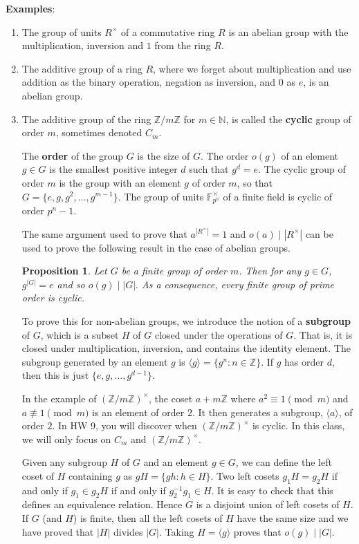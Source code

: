 \documentclass{article}
\def\Z{{\mathbb Z}}
\def\F{{\mathbb F}}
\def\N{{\mathbb N}}
\def\Z{{\mathbb Z}}
\def\F{{\mathbb F}}
\newtheorem{proposition}[subsection]{Proposition}
\begin{document}
\vspace{5pt}
\noindent\textbf{Examples}:
\begin{enumerate}
    \item The group of units $R^\times$ of a commutative ring $R$ is an abelian group with the multiplication, inversion and $1$ from the ring $R$.
    \item The additive group of a ring $R$, where we forget about multiplication and use addition as the binary operation, negation as inversion, and $0$ as $e$, is an abelian group.
    \item The additive group of the ring $\Z/m\Z$ for $m\in\N$, is called the \textbf{cyclic} group of order $m$, sometimes denoted $C_m$.

    The \textbf{order} of the group $G$ is the size of $G$. The order $o(g)$ of an element $g\in G$ is the smallest positive integer $d$ such that $g^d = e$. The cyclic group of order $m$ is the group with an element $g$ of order $m$, so that $G = \{e, g, g^2,\ldots, g^{m-1}\}$. The group of units $\F_{p^n}^\times$ of a finite field is cyclic of order $p^n - 1$.

    The same argument used to prove that $a^{|R^\times|} = 1$ and $o(a)\mid|R^\times|$ can be used to prove the following result in the case of abelian groups.

    \begin{proposition}
        Let $G$ be a finite group of order $m$. Then for any $g\in G$, $g^{|G|} = e$ and so $o(g)\mid |G|.$ As a consequence, every finite group of prime order is cyclic.
    \end{proposition}

    To prove this for non-abelian groups, we introduce the notion of a \textbf{subgroup} of $G$, which is a subset $H$ of $G$ closed under the operations of $G$. That is, it is closed under multiplication, inversion, and contains the identity element. The subgroup generated by an element $g$ is $\langle g\rangle = \{g^n\colon n\in\Z\}$. If $g$ has order $d$, then this is just $\{e,g,\ldots,g^{d-1}\}.$

    In the example of $(\Z/m\Z)^\times$, the coset $a+m\Z$ where $a^2\equiv 1\pmod{m}$ and $a\not\equiv 1\pmod{m}$ is an element of order $2$. It then generates a subgroup, $\langle a\rangle$, of order $2$. In HW 9, you will discover when $(\Z/m\Z)^\times$ is cyclic. In this class, we will only focus on $C_m$ and $(\Z/m\Z)^\times$. 

    Given any subgroup $H$ of $G$ and an element $g\in G$, we can define the left coset of $H$ containing $g$ as $gH = \{gh\colon h\in H\}$. Two left cosets $g_1H = g_2H$ if and only if $g_1\in g_2H$ if and only if $g_2^{-1}g_1\in H$. It is easy to check that this defines an equivalence relation. Hence $G$ is a disjoint union of left cosets of $H$. If $G$ (and $H$) is finite, then all the left cosets of $H$ have the same size and we have proved that $|H|$ divides $|G|$. Taking $H = \langle g\rangle$ proves that $o(g)\mid |G|$. 


\end{enumerate}
\end{document}
